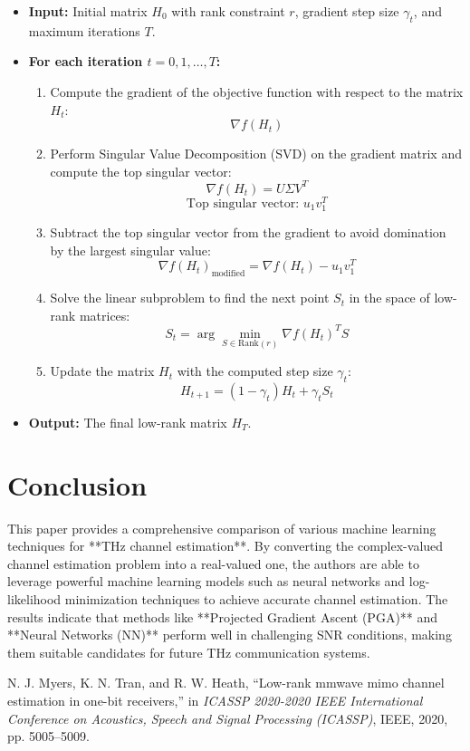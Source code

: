 \documentclass{article}
\begin{document}
\begin{itemize}
    \item \textbf{Input:} Initial matrix \( H_0 \) with rank constraint \( r \), gradient step size \( \gamma_t \), and maximum iterations \( T \).
    \item \textbf{For each iteration \( t = 0, 1, \dots, T \):}
    \begin{enumerate}
        \item Compute the gradient of the objective function with respect to the matrix \( H_t \):
        \[
        \nabla f(H_t)
        \]
        
        \item Perform Singular Value Decomposition (SVD) on the gradient matrix and compute the top singular vector:
        \[
        \nabla f(H_t) = U \Sigma V^T
        \]
        \[
        \text{Top singular vector: } u_1 v_1^T
        \]
        
        \item Subtract the top singular vector from the gradient to avoid domination by the largest singular value:
        \[
        \nabla f(H_t)_{\text{modified}} = \nabla f(H_t) - u_1 v_1^T
        \]
        
        \item Solve the linear subproblem to find the next point \( S_t \) in the space of low-rank matrices:
        \[
        S_t = \arg\min_{S \in \text{Rank}(r)} \nabla f(H_t)^T S
        \]
        
        \item Update the matrix \( H_t \) with the computed step size \( \gamma_t \):
        \[
        H_{t+1} = (1 - \gamma_t) H_t + \gamma_t S_t
        \]
    \end{enumerate}
    \item \textbf{Output:} The final low-rank matrix \( H_T \).
\end{itemize}



\section{Conclusion}

This paper provides a comprehensive comparison of various machine learning techniques for **THz channel estimation**. By converting the complex-valued channel estimation problem into a real-valued one, the authors are able to leverage powerful machine learning models such as neural networks and log-likelihood minimization techniques to achieve accurate channel estimation. The results indicate that methods like **Projected Gradient Ascent (PGA)** and **Neural Networks (NN)** perform well in challenging SNR conditions, making them suitable candidates for future THz communication systems.
\begin{thebibliography}{9}
  N. J. Myers, K. N. Tran, and R. W. Heath, “Low-rank mmwave mimo channel estimation in one-bit receivers,” in \textit{ICASSP 2020-2020 IEEE International Conference on Acoustics, Speech and Signal Processing (ICASSP)}, IEEE, 2020, pp. 5005–5009.
  \end{thebibliography}
\end{document}
